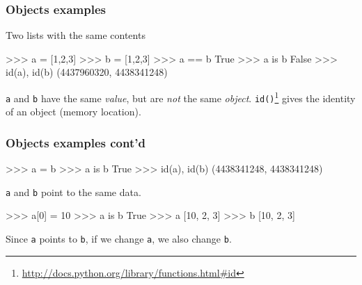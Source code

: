 \documentclass[xetex,10pt]{beamer}
\def\pythoni{\lstinline[language=pythontim]}
\begin{document}
\begin{frame}[fragile]
	\frametitle{Objects examples}

Two lists with the same contents
\begin{python}
>>> a = [1,2,3]
>>> b = [1,2,3]
>>> a == b
True
>>> a is b
False
>>> id(a), id(b)
(4437960320, 4438341248)
\end{python}

\pythoni{a} and \pythoni{b} have the same \emph{value}, but are \emph{not} the same \emph{object}.	\pythoni{id()}\footnote[frame]{\url{http://docs.python.org/library/functions.html\#id}} gives the identity of an object (memory location).

\end{frame}


\begin{frame}[fragile]
	\frametitle{Objects examples cont'd}

\begin{python}
>>> a = b
>>> a is b
True
>>> id(a), id(b)
(4438341248, 4438341248)
\end{python}

\pythoni{a} and \pythoni{b} point to the same data.

\pause

\begin{python}
>>> a[0] = 10
>>> a is b
True
>>> a
[10, 2, 3]
>>> b
[10, 2, 3]
\end{python}

Since \pythoni{a} points to \pythoni{b}, if we change \pythoni{a}, we also change \pythoni{b}.

\end{frame}
\end{document}
